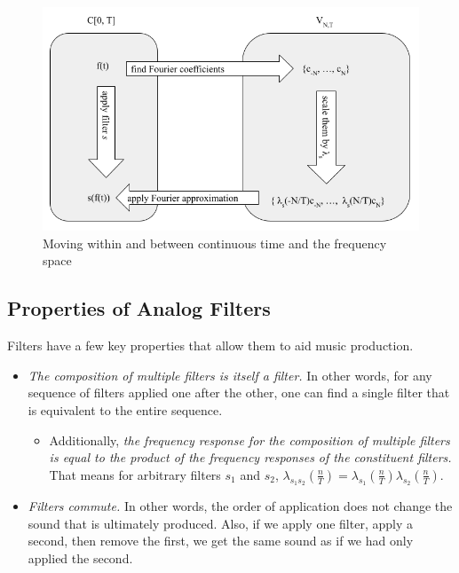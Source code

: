 \begin{figure}[h]
    \centering
    \includegraphics[scale=.35]{analog_filter_space_diagram.png}
    \caption{Moving within and between continuous time and the frequency space}
    \label{fig:analog_filter_space_diagram}
\end{figure}

\subsection{Properties of Analog Filters}

\par \indentt Filters have a few key properties that allow them to aid music production.\cite{Ryan}

\begin{itemize} 
    \item \textit{The composition of multiple filters is itself a filter.} In other words, for any sequence of filters applied one after the other, one can find a single filter that is equivalent to the entire sequence.
    \begin{itemize}
        \item Additionally, \textit{the frequency response for the composition of multiple filters is equal to the product of the frequency responses of the constituent filters.} That means for arbitrary filters $s_1$ and $s_2$, $\lambda_{s_1s_2}(\frac{n}{T}) = \lambda_{s_1}(\frac{n}{T}) \lambda_{s_2}(\frac{n}{T})$.
    \end{itemize}
    \item \textit{Filters commute.} In other words, the order of application does not change the sound that is ultimately produced. Also, if we apply one filter, apply a second, then remove the first, we get the same sound as if we had only applied the second.
\end{itemize}

